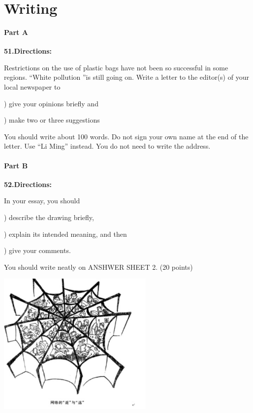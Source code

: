 \section{Writing}
\paragraph{Part A}

\textbf{51.Directions:}

\qquad Restrictions on the use of plastic bags have not been so successful in some regions. “White pollution ”is still going on. Write a letter to the editor(s) of your local newspaper to

)      give your opinions briefly and

)      make two or three suggestions

\qquad You should write about 100 words. Do not sign your own name at the end of the letter. Use ``Li Ming'' instead. You do not need to write the address.

\paragraph{Part B}

\textbf{52.Directions:}

\qquad In your essay, you should

) describe the drawing briefly,

) explain its intended meaning, and then

) give your comments.

\qquad You should write neatly on ANSHWER SHEET 2. (20 points)

\begin{center}\includegraphics[height=7cm]{8.jpg}\end{center}
